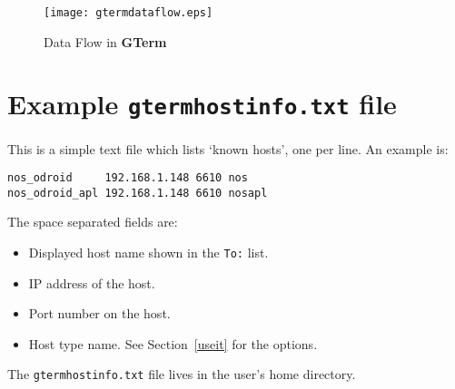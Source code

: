 \documentclass[a4paper,twoside,11pt]{article}
\newcommand{\newpara}{\par\vspace{4mm}\noindent}
\begin{document}
\begin{figure}
	\centering
		\texttt{[image: gtermdataflow.eps]}
	\caption{Data Flow in \textbf{GTerm}}
	\label{fig:dataflow}
\end{figure}

\section{Example \texttt{gtermhostinfo.txt} file}
This is a simple text file which lists `known hosts', one per line. An example is:
\begin{lstlisting}
nos_odroid     192.168.1.148 6610 nos
nos_odroid_apl 192.168.1.148 6610 nosapl
\end{lstlisting}
The space separated fields are: 
\begin{itemize}
\item  Displayed host name shown in the \texttt{To:} list.
\item IP address of the host.
\item Port number on the host.
\item Host type name. See Section~\ref{useit} for the options.
\end{itemize}

\newpara
The \texttt{gtermhostinfo.txt} file lives in the user's home directory.
\end{document}
